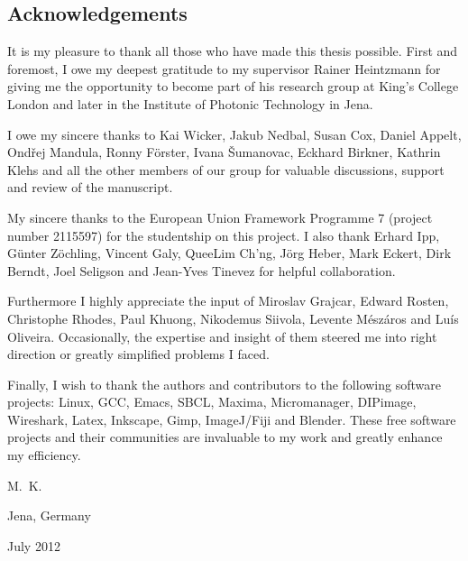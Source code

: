 \documentclass[oneside,a4paper,12pt,BCOR20mm,DIV14]{scrbook}
\begin{document}
\subsection*{Acknowledgements}
It is my pleasure to thank all those who have made this thesis
possible. First and foremost, I owe my deepest gratitude to my
supervisor Rainer Heintzmann for giving me the opportunity to become
part of his research group at King's College London and later in the
Institute of Photonic Technology in Jena.

I owe my sincere thanks to Kai Wicker, Jakub Nedbal, Susan Cox, Daniel
Appelt, Ond\v rej Mandula, Ronny F\"orster, Ivana \v Sumanovac,
Eckhard Birkner, Kathrin Klehs and all the other members of our group
for valuable discussions, support and review of the manuscript.

My sincere thanks to the European Union Framework Programme 7 (project
number 2115597) for the studentship on this project.
I also thank Erhard Ipp, G\"unter Z\"ochling, Vincent Galy, QueeLim
Ch'ng, J\"org Heber, Mark Eckert, Dirk Berndt, Joel Seligson and
Jean-Yves Tinevez for helpful collaboration.   

Furthermore I highly appreciate the input of Miroslav Grajcar, Edward
Rosten, Christophe Rhodes, Paul Khuong, Nikodemus Siivola, Levente
M\'esz\'aros and Lu\' is Oliveira. Occasionally, the expertise and
insight of them steered me into right direction or greatly simplified
problems I faced.

Finally, I wish to thank the authors and contributors to the following
software projects: Linux, GCC, Emacs, SBCL, Maxima, Micromanager,
DIPimage, Wireshark, Latex, Inkscape, Gimp, ImageJ/Fiji and Blender.
These free software projects and their communities are invaluable to
my work and greatly enhance my efficiency.

\begin{flushright}
  M.~K.
\end{flushright}

\noindent
Jena, Germany

\noindent
July 2012

\newpage
\tableofcontents
\printnomenclature
\newpage

\newpage




\appendix





%




%

%

\end{document}
